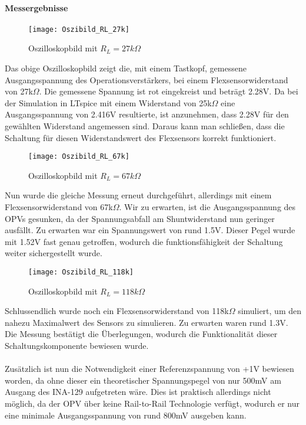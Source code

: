 \documentclass[titlepage,12pt,twoside]{article}
\begin{document}
\paragraph{Messergebnisse}
\hfill \break
\hfill \break
\begin{figure}[H]
	\begin{center}
		\scalebox{1.2}
		{\texttt{[image: Oszibild\_RL\_27k]}}
		\caption{Oszilloskopbild mit $R_{L} = 27k\Omega$}
		\label{fig:Oszibild_RL_27k}		
	\end{center}
\end{figure}
Das obige Oszilloskopbild zeigt die, mit einem Tastkopf, gemessene Ausgangsspannung des Operationsverstärkers, bei einem Flexsensorwiderstand
von 27k$\Omega$. Die gemessene Spannung ist rot eingekreist und beträgt 2.28V. Da bei der Simulation in LTspice mit einem Widerstand 
von 25k$\Omega$ eine Ausgangsspannung von 2.416V resultierte, ist anzunehmen, dass 2.28V 
für den gewählten Widerstand angemessen sind. Daraus kann man schließen, dass die Schaltung
für diesen Widerstandswert des Flexsensors korrekt funktioniert.
\\
\begin{figure}[H]
	\begin{center}
		\scalebox{1.0}
		{\texttt{[image: Oszibild\_RL\_67k]}}
		\caption{Oszilloskopbild mit $R_{L} = 67k\Omega$}
		\label{fig:Oszibild_RL_67k}		
	\end{center}
\end{figure}
\hfill \break
Nun wurde die gleiche Messung erneut durchgeführt, allerdings mit einem Flexsensorwiderstand
von 67k$\Omega$. Wir zu erwarten, ist die Ausgangsspannung des OPVs gesunken, da der 
Spannungsabfall am Shuntwiderstand nun geringer ausfällt. Zu erwarten war ein Spannungswert
von rund 1.5V. Dieser Pegel wurde mit 1.52V fast genau getroffen, wodurch die funktionsfähigkeit
der Schaltung weiter sichergestellt wurde.
\begin{figure}[H]
	\begin{center}
		\scalebox{1.0}
		{\texttt{[image: Oszibild\_RL\_118k]}}
		\caption{Oszilloskopbild mit $R_{L} = 118k\Omega$}
		\label{fig:Oszibild_RL_118k}		
	\end{center}
\end{figure}
\hfill \break
Schlussendlich wurde noch ein Flexsensorwiderstand von 118k$\Omega$ simuliert, um den
nahezu Maximalwert des Sensors zu simulieren. Zu erwarten waren rund 1.3V. Die Messung
bestätigt die Überlegungen, wodurch die Funktionalität dieser Schaltungskomponente bewiesen
wurde. \\
\\
Zusätzlich ist nun die Notwendigkeit einer Referenzspannung von +1V bewiesen worden, da
ohne dieser ein theoretischer Spannungspegel von nur 500mV am Ausgang des INA-129 aufgetreten
wäre.  Dies ist praktisch allerdings nicht möglich, da der OPV über keine Rail-to-Rail
Technologie verfügt, wodurch er nur eine minimale Ausgangsspannung von rund 800mV ausgeben 
kann.
\\
\end{document}
